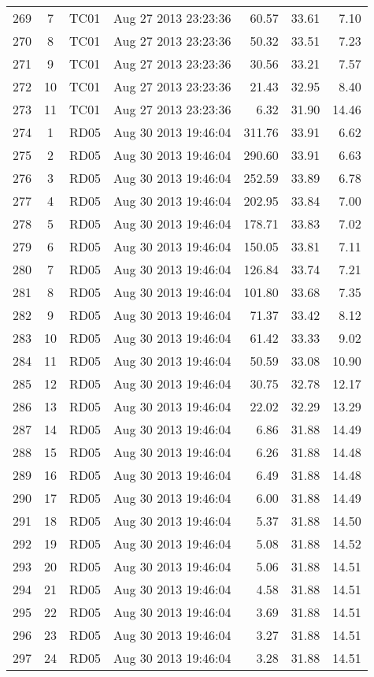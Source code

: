 \documentclass{article}
\begin{document}
\begin{longtable}{ccllrrr}
269 & 7 & TC01 & Aug 27 2013 23:23:36 & 60.57 & 33.61 & 7.10 \\
270 & 8 & TC01 & Aug 27 2013 23:23:36 & 50.32 & 33.51 & 7.23 \\
271 & 9 & TC01 & Aug 27 2013 23:23:36 & 30.56 & 33.21 & 7.57 \\
272 & 10 & TC01 & Aug 27 2013 23:23:36 & 21.43 & 32.95 & 8.40 \\
273 & 11 & TC01 & Aug 27 2013 23:23:36 & 6.32 & 31.90 & 14.46 \\
\hline
274 & 1 & RD05 & Aug 30 2013 19:46:04 & 311.76 & 33.91 & 6.62 \\
275 & 2 & RD05 & Aug 30 2013 19:46:04 & 290.60 & 33.91 & 6.63 \\
276 & 3 & RD05 & Aug 30 2013 19:46:04 & 252.59 & 33.89 & 6.78 \\
277 & 4 & RD05 & Aug 30 2013 19:46:04 & 202.95 & 33.84 & 7.00 \\
278 & 5 & RD05 & Aug 30 2013 19:46:04 & 178.71 & 33.83 & 7.02 \\
279 & 6 & RD05 & Aug 30 2013 19:46:04 & 150.05 & 33.81 & 7.11 \\
280 & 7 & RD05 & Aug 30 2013 19:46:04 & 126.84 & 33.74 & 7.21 \\
281 & 8 & RD05 & Aug 30 2013 19:46:04 & 101.80 & 33.68 & 7.35 \\
282 & 9 & RD05 & Aug 30 2013 19:46:04 & 71.37 & 33.42 & 8.12 \\
283 & 10 & RD05 & Aug 30 2013 19:46:04 & 61.42 & 33.33 & 9.02 \\
284 & 11 & RD05 & Aug 30 2013 19:46:04 & 50.59 & 33.08 & 10.90 \\
285 & 12 & RD05 & Aug 30 2013 19:46:04 & 30.75 & 32.78 & 12.17 \\
286 & 13 & RD05 & Aug 30 2013 19:46:04 & 22.02 & 32.29 & 13.29 \\
287 & 14 & RD05 & Aug 30 2013 19:46:04 & 6.86 & 31.88 & 14.49 \\
288 & 15 & RD05 & Aug 30 2013 19:46:04 & 6.26 & 31.88 & 14.48 \\
289 & 16 & RD05 & Aug 30 2013 19:46:04 & 6.49 & 31.88 & 14.48 \\
290 & 17 & RD05 & Aug 30 2013 19:46:04 & 6.00 & 31.88 & 14.49 \\
291 & 18 & RD05 & Aug 30 2013 19:46:04 & 5.37 & 31.88 & 14.50 \\
292 & 19 & RD05 & Aug 30 2013 19:46:04 & 5.08 & 31.88 & 14.52 \\
293 & 20 & RD05 & Aug 30 2013 19:46:04 & 5.06 & 31.88 & 14.51 \\
294 & 21 & RD05 & Aug 30 2013 19:46:04 & 4.58 & 31.88 & 14.51 \\
295 & 22 & RD05 & Aug 30 2013 19:46:04 & 3.69 & 31.88 & 14.51 \\
296 & 23 & RD05 & Aug 30 2013 19:46:04 & 3.27 & 31.88 & 14.51 \\
297 & 24 & RD05 & Aug 30 2013 19:46:04 & 3.28 & 31.88 & 14.51 \\
\hline

\end{longtable}
\end{document}
